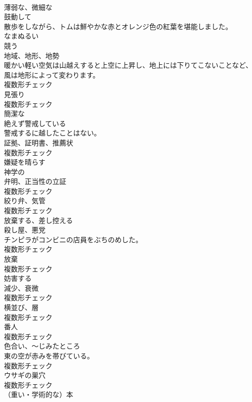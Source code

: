 \documentclass[8pt]{extreport}
\begin{document}
\begin{CJK}{UTF8}{min}
\\	[形容詞]	薄弱な、微細な	
\\	[形容詞]	鼓動して	
\\	散歩をしながら、トムは鮮やかな赤とオレンジ色の紅葉を堪能しました。	
\\	[形容詞]	なまぬるい	
\\	[動詞]	競う	
\\	[名詞]	地域、地形、地勢	
\\	暖かい軽い空気は山越えすると上空に上昇し、地上には下りてこないことなど、風は地形によって変わります。	
\\	複数形チェック
\\	[名詞]	見張り	
\\	複数形チェック
\\	[形容詞]	簡潔な	
\\	[形容詞]	絶えず警戒している	
\\	警戒するに越したことはない。	
\\	[名詞]	証拠、証明書、推薦状	
\\	複数形チェック
\\	[動詞]	嫌疑を晴らす	
\\	[形容詞]	神学の	
\\	[名詞]	弁明、正当性の立証	
\\	複数形チェック
\\	[名詞]	絞り弁、気管	
\\	複数形チェック
\\	[動詞]	放棄する、差し控える	
\\	[名詞]	殺し屋、悪党	
\\	チンピラがコンビニの店員をぶちのめした。	
\\	複数形チェック
\\	[名詞]	放棄	
\\	複数形チェック
\\	[動詞]	妨害する	
\\	[名詞]	減少、衰微	
\\	複数形チェック
\\	[名詞]	横並び、層	
\\	複数形チェック
\\	[名詞]	番人	
\\	複数形チェック
\\	[名詞]	色合い、〜じみたところ	
\\	東の空が赤みを帯びている。	
\\	複数形チェック
\\	[名詞]	ウサギの巣穴	
\\	複数形チェック
\\	[名詞]	（重い・学術的な）本	

\end{CJK}
\end{document}
